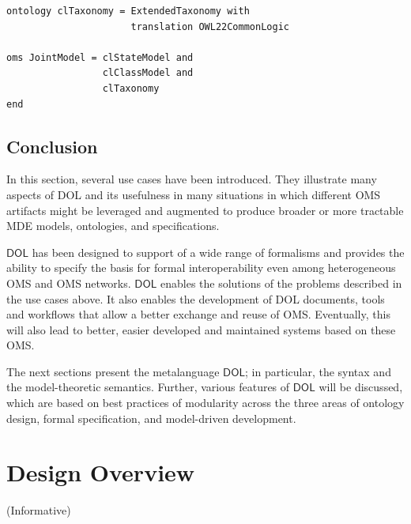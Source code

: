 \documentclass[10pt,fleqn,final]{scrreprt}
\newcommand*{\DOL}{\ensuremath{\mathsf{DOL}}\xspace}
\newcommand{\informative}[0]{{\begin{center}{\Large{(Informative})}\end{center}} \bigskip}
\newcommand{\clauseI}[1]{\chapter{#1} \informative }
\newenvironment{definitions}[0]{\medskip }{}
\begin{document}
\begin{definitions}
\begin{lstlisting}[basicstyle=\ttfamily\small,language=dolText,alsolanguage=owl2Manchester,escapechar=@,mathescape]
ontology clTaxonomy = ExtendedTaxonomy with
                      translation OWL22CommonLogic

oms JointModel = clStateModel and
                 clClassModel and
                 clTaxonomy
end
\end{lstlisting}

\section{Conclusion}

In this section, several use cases have been introduced. They illustrate many aspects of DOL and its usefulness in many situations in which different OMS artifacts might be leveraged and augmented to produce broader or more tractable MDE models, ontologies, and specifications.

 \DOL has been designed to support of a wide range of formalisms and
provides the ability to specify the basis for formal interoperability even among heterogeneous OMS and OMS networks. \DOL enables the solutions of the problems described in the use cases above. It also enables the development of DOL documents, tools and workflows that 
allow  a better exchange and reuse of OMS. Eventually, this will also lead to better, easier developed and maintained systems based on these OMS.

The next sections present the metalanguage \DOL{}; in particular, the syntax and the model-theoretic semantics. Further, various features of \DOL will be discussed, which  are based on  best practices of modularity  across
 the three areas of ontology design, formal 
specification, and model-driven development.




\clauseI{Design Overview} \label{c:design}


\end{definitions}
\end{document}
